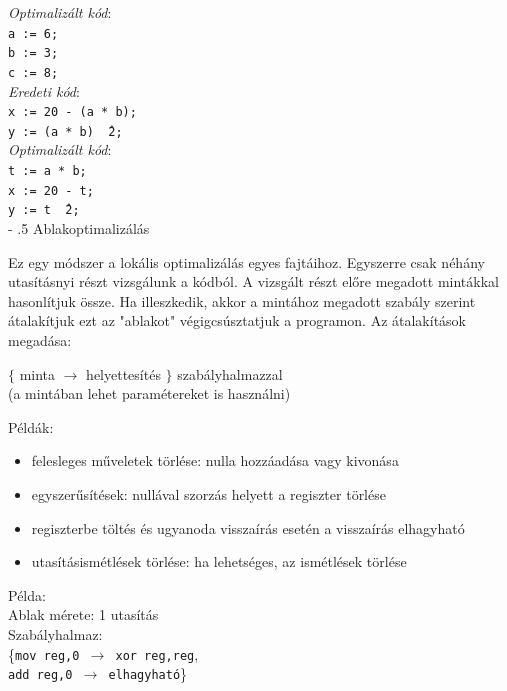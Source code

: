 \documentclass[12pt,margin=0px]{article}
\makeatletter
\renewcommand\paragraph{%
	\@startsection{paragraph}{4}{0mm}%
	{-\baselineskip}%
	{.5\baselineskip}%
	{\normalfont\normalsize\bfseries}}
\makeatother
\begin{document}
    \noindent \emph{Optimalizált kód}:\\
    \texttt{a := 6;}\\
    \texttt{b := 3;}\\
    \texttt{c := 8;}\\

    \noindent \emph{Eredeti kód}:\\
    \texttt{x := 20 - (a * b);}\\
    \texttt{y := (a * b) \^\ 2;}\\

    \noindent \emph{Optimalizált kód}:\\
    \texttt{t := a * b;}\\
    \texttt{x := 20 - t;}\\
    \texttt{y := t \^\ 2;}\\

	\paragraph{Ablakoptimalizálás}

    \noindent Ez egy módszer a lokális optimalizálás egyes fajtáihoz. Egyszerre csak néhány utasításnyi részt vizsgálunk a kódból. A vizsgált részt előre megadott mintákkal hasonlítjuk össze. Ha illeszkedik, akkor a mintához megadott szabály szerint átalakítjuk ezt az "ablakot" végigcsúsztatjuk a programon. Az átalakítások megadása:

	\begin{center}
	$ \lbrace$ minta $ \rightarrow $ helyettesítés $\rbrace$ szabályhalmazzal\\
	(a mintában lehet paramétereket is használni)
	\end{center}

	\noindent Példák:
	\begin{itemize}
		\item
		felesleges műveletek törlése: nulla hozzáadása vagy kivonása
		\item
		egyszerűsítések: nullával szorzás helyett a regiszter törlése
		\item
		regiszterbe töltés és ugyanoda visszaírás esetén a visszaírás elhagyható
		\item
		utasításismétlések törlése: ha lehetséges, az ismétlések törlése
	\end{itemize}
\newpage    
    \noindent Példa: \\
    
    \noindent Ablak mérete: 1 utasítás\\
    Szabályhalmaz:\\
    \{\texttt{mov reg,0 $\to$ xor reg,reg},\\
    \texttt{add reg,0 $\to$ elhagyható}\}\\
	
\end{document}
